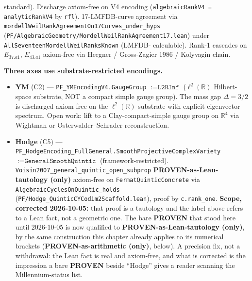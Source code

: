 \begin{warning}
\begin{itemize}
standard). Discharge axiom-free on V4 encoding
(\texttt{algebraic\allowbreak{}Rank\allowbreak{}V4 = analyticRankV4} by \texttt{rfl}).
17-LMFDB-curve agreement via
\texttt{mordell\allowbreak{}Weil\allowbreak{}Rank\allowbreak{}Agreement\allowbreak{}On17Curves\_\allowbreak{}under\_\allowbreak{}hyps}
(\texttt{PF/\allowbreak{}Algebraic\allowbreak{}Geometry/\allowbreak{}Mordell\allowbreak{}Weil\allowbreak{}Rank\allowbreak{}Agreement17.\allowbreak{}lean})
under \texttt{All\allowbreak{}Seventeen\allowbreak{}Mordell\allowbreak{}Weil\allowbreak{}Ranks\allowbreak{}Known} (LMFDB-
calculable). Rank-1 cascades on $E_{37.a1}$, $E_{43.a1}$
axiom-free via Heegner / Gross-Zagier 1986 / Kolyvagin chain.
\end{itemize}

\textbf{Three axes use substrate-restricted encodings.}
\begin{itemize}
\item \textbf{YM} (C2) --- \texttt{PF\_YMEncodingV4.GaugeGroup}
$:= \texttt{L2RInf}$ ($\ell^{2}(\mathbb{R})$ Hilbert-space
substrate, NOT a compact simple gauge group). The mass gap
$\Delta = 3/2$ is discharged axiom-free on the
$\ell^{2}(\mathbb{R})$ substrate with explicit eigenvector
spectrum. Open work: lift to a Clay-compact-simple gauge group
on $\mathbb{R}^{4}$ via Wightman or Osterwalder--Schrader
reconstruction.
\item \textbf{Hodge} (C5) --- \texttt{PF\_\allowbreak{}HodgeEncoding\_\allowbreak{}FullGeneral.\allowbreak{}Smooth\allowbreak{}Projective\allowbreak{}Complex\allowbreak{}Variety}
$:= \texttt{GeneralSmoothQuintic}$ (framework-restricted).
\texttt{Voisin2007\_\allowbreak{}general\_\allowbreak{}quintic\_\allowbreak{}open\_\allowbreak{}subprop} \textbf{PROVEN-as-Lean-tautology (only)}
axiom-free on \texttt{FermatQuinticConcrete} via
\texttt{Algebraic\allowbreak{}Cycles\allowbreak{}On\allowbreak{}Quintic\_\allowbreak{}holds}
(\texttt{PF/\allowbreak{}Hodge\_\allowbreak{}Quintic\allowbreak{}CYCodim2Scaffold.\allowbreak{}lean}), proof by
\texttt{c.rank\_one}.
\textbf{Scope, corrected 2026-10-05:} that proof is a tautology and the
label above refers to a Lean fact, not a geometric one. The bare \textbf{PROVEN} that stood here until 2026-10-05 is now qualified to \textbf{PROVEN-as-Lean-tautology (only)}, by the same construction this chapter already applies to its numerical brackets (\textbf{PROVEN-as-arithmetic (only)}, below). A precision fix, not a withdrawal: the Lean fact is real and axiom-free, and what is corrected is the impression a bare \textbf{PROVEN} beside ``Hodge'' gives a reader scanning the Millennium-status list.

\end{itemize}
\end{warning}
